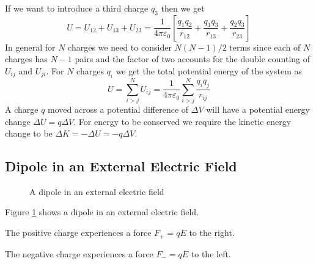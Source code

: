 \documentclass{article}
\begin{document}
    If we want to introduce a third charge \(q_3\) then we get
    \[U = U_{12} + U_{13} + U_{23} = \frac{1}{4\pi\varepsilon_0}\left[\frac{q_1q_2}{r_{12}} + \frac{q_1q_3}{r_{13}} + \frac{q_2q_3}{r_{23}}\right]\]
    In general for \(N\) charges we need to consider \(N(N - 1)/2\) terms since each of \(N\) charges has \(N - 1\) pairs and the factor of two accounts for the double counting of \(U_{ij}\) and \(U_{ji}\).
    For \(N\) charges \(q_i\) we get the total potential energy of the system as
    \[U = \sum_{i>j}^N U_{ij} = \frac{1}{4\pi\varepsilon_0}\sum_{i>j}^N \frac{q_iq_j}{r_{ij}}\]
    A charge \(q\) moved across a potential difference of \(\Delta V\) will have a potential energy change \(\Delta U = q\Delta V\).
    For energy to be conserved we require the kinetic energy change to be \(\Delta K = -\Delta U = -q\Delta V\).
    
    \subsection{Dipole in an External Electric Field}
    \begin{figure}[ht]
        \centering
        \caption{A dipole in an external electric field}
        \label{fig:dipole in an external electric field}
    \end{figure}
    Figure \ref{fig:dipole in an external electric field} shows a dipole in an external electric field.
    
    The positive charge experiences a force \(F_+ = qE\) to the right.
    
    The negative charge experiences a force \(F_- = qE\) to the left.
    
\end{document}
